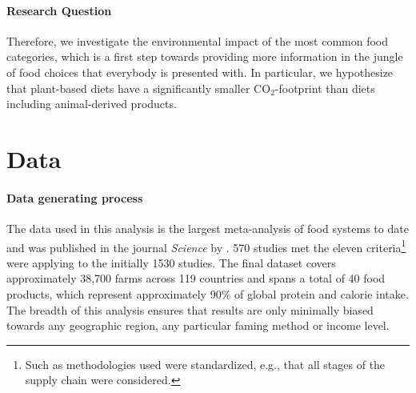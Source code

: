 \documentclass{article}
\begin{document}
\paragraph*{Research Question}
Therefore, we investigate the environmental impact of the most common food categories, which is a first step towards  providing more information in the jungle of food choices that everybody is presented with. In particular, we hypothesize that  plant-based diets  have a significantly smaller CO$_2$-footprint than  diets including animal-derived products. %

\section{Data}
\label{data}
\paragraph{Data generating process} \label{dataGen}
The data used in this analysis  is the largest meta-analysis of food systems to date and was published in the journal \textit{Science} by \citet{Poore2018}.
570 studies met the eleven criteria\footnote{Such as  methodologies used were standardized, e.g., that all stages of the supply chain were considered.} \citet{Poore2018}  were applying to the initially  1530 studies.
The final dataset covers approximately 38,700 farms across 119 countries and spans a total of 40 food products, which represent approximately 90\% of global protein and calorie intake. The breadth of this analysis ensures that results are only minimally biased towards any geographic region,  any particular faming method or income level.
\end{document}
